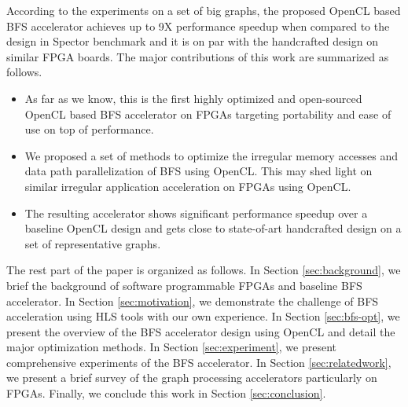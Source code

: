 According to the experiments on a set of big graphs, the proposed OpenCL based BFS 
accelerator achieves up to 9X performance speedup when compared to the design 
in Spector benchmark and it is on par with the handcrafted design on similar FPGA boards. 
The major contributions of this work are summarized as follows.
\begin{itemize}
    \item As far as we know, this is the first highly optimized and open-sourced 
		OpenCL based BFS accelerator on FPGAs targeting portability and ease of 
		use on top of performance. 
    \item We proposed a set of methods to optimize the irregular
		memory accesses and data path parallelization of BFS using OpenCL. 
		This may shed light on similar irregular application acceleration on 
		FPGAs using OpenCL.
    \item The resulting accelerator shows significant performance speedup 
        over a baseline OpenCL design and gets close to state-of-art handcrafted 
		design on a set of representative graphs.
\end{itemize}

The rest part of the paper is organized as follows. In Section \ref{sec:background}, 
we brief the background of software programmable FPGAs and baseline BFS accelerator. 
In Section \ref{sec:motivation},  
we demonstrate the challenge of BFS acceleration using HLS tools with our own experience. 
In Section \ref{sec:bfs-opt}, we present the overview of the BFS accelerator 
design using OpenCL and detail the major optimization methods.
In Section \ref{sec:experiment}, we present comprehensive experiments of the 
BFS accelerator. In Section \ref{sec:relatedwork}, we present a brief survey of 
the graph processing accelerators particularly on FPGAs. Finally, we conclude 
this work in Section \ref{sec:conclusion}.


